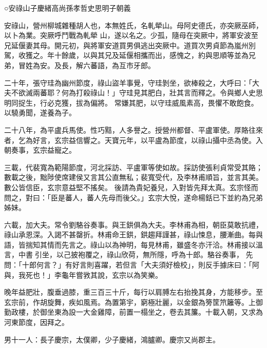 
\begin{pinyinscope}

 ○安祿山子慶緒高尚孫孝哲史思明子朝義



 安祿山，營州柳城雜種胡人也，本無姓氏，名軋犖山。母阿史德氏，亦突厥巫師，以卜為業。突厥呼鬥戰為軋犖
 山，遂以名之。少孤，隨母在突厥中，將軍安波至兄延偃妻其母。開元初，與將軍安道買男俱逃出突厥中。道買次男貞節為嵐州別駕，收獲之。年十餘歲，以與其兄及延偃相攜而出，感愧之，約與思順等並為兄弟，冒姓為安。及長，解六蕃語，為互市牙郎。



 二十年，張守珪為幽州節度，祿山盜羊事覺，守珪剝坐，欲棒殺之，大呼曰：「大夫不欲滅兩蕃耶？何為打殺祿山！」守珪見其肥白，壯其言而釋之。令與鄉人史思明同捉生，行必克獲，拔為偏將。
 常嫌其肥，以守珪威風素高，畏懼不敢飽食。以驍勇聞，遂養為子。



 二十八年，為平盧兵馬使。性巧黠，人多譽之。授營州都督、平盧軍使。厚賂往來者，乞為好言，玄宗益信響之。天寶元年，以平盧為節度，以祿山攝中丞為使。入朝奏事，玄宗益寵之。



 三載，代裴寬為範陽節度，河北採訪、平盧軍等使如故。採訪使張利貞常受其賂；數載之後，黜陟使席建侯又言其公直無私；裴寬受代，及李林甫順旨，並言其美。數公皆信臣，玄宗意益堅不搖矣。
 後請為貴妃養兒，入對皆先拜太真。玄宗怪而問之，對曰：「臣是蕃人，蕃人先母而後父。」玄宗大悅，遂命楊銛已下並約為兄弟姊妹。



 六載，加大夫。常令劉駱谷奏事。與王鉷俱為大夫。李林甫為相，朝臣莫敢抗禮，祿山承恩深。入謁不甚罄折。林甫命王鉷，鉷趨拜謹甚，祿山悚息，腰漸曲。每與語，皆揣知其情而先言之。祿山以為神明，每見林甫，雖盛冬亦汗洽。林甫接以溫言，中書引坐，以己披袍覆之，祿山欣荷，無所隱，呼為十郎。駱谷奏事，
 先問：「十郎何言？」有好言則喜躍，若但言「大夫須好檢校」，則反手據床曰：「阿與，我死也！」李龜年嘗敩其說，玄宗以為笑樂。



 晚年益肥壯，腹垂過膝，重三百三十斤，每行以肩膊左右抬挽其身，方能移步。至玄宗前，作胡旋舞，疾如風焉。為置第宇，窮極壯麗，以金銀為篣筐笊籬等。上御勤政樓，於御坐東為設一大金雞障，前置一榻坐之，卷去其簾。十載入朝，又求為河東節度，因拜之。



 男十一人：長子慶宗，太僕卿，少子慶緒，鴻臚卿。慶宗又尚郡主。




\end{pinyinscope}
